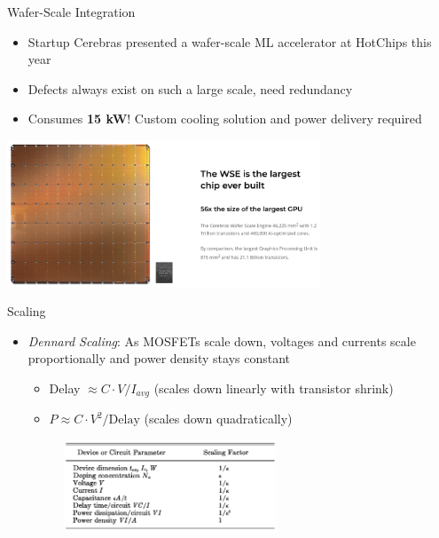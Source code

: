 \documentclass[12pt]{beamer}
\begin{document}
\begin{frame}{Wafer-Scale Integration}
  \begin{itemize}
    \item Startup Cerebras presented a wafer-scale ML accelerator at HotChips this year
    \item Defects always exist on such a large scale, need redundancy
    \item Consumes \textbf{15 kW}! Custom cooling solution and power delivery required
  \end{itemize}
  \begin{center}
   \includegraphics[width=0.7\textwidth]{cerebras.png}
  \end{center}
\end{frame}

\begin{frame}{Scaling}
  \begin{itemize}
    \item \textit{Dennard Scaling}: As MOSFETs scale down, voltages and currents scale proportionally and power density stays constant
      \begin{itemize}
        \item Delay $\approx C \cdot V / I_{avg}$ (scales down linearly with transistor shrink)
        \item $P \approx C \cdot V^2 / \text{Delay}$ (scales down quadratically)
      \end{itemize}
      \vspace{0.5cm}
      \begin{figure}
        \includegraphics[width=0.6\textwidth]{dennard.png}
      \end{figure}
  \end{itemize}
\end{frame}
\end{document}
